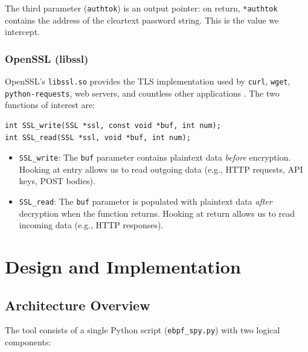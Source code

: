 \documentclass[11pt,a4paper]{article}
\begin{document}
The third parameter (\texttt{authtok}) is an output pointer: on return,
\texttt{*authtok} contains the address of the cleartext password string. This
is the value we intercept.

\subsubsection{OpenSSL (libssl)}

OpenSSL's \texttt{libssl.so} provides the TLS implementation used by
\texttt{curl}, \texttt{wget}, \texttt{python-requests}, web servers, and
countless other applications \cite{openssl_docs}. The two functions of
interest are:

\begin{lstlisting}[style=cstyle, caption={SSL\_write and SSL\_read signatures}, label={lst:ssl_sig}]
int SSL_write(SSL *ssl, const void *buf, int num);
int SSL_read(SSL *ssl, void *buf, int num);
\end{lstlisting}

\begin{itemize}
    \item \texttt{SSL\_write}: The \texttt{buf} parameter contains plaintext
          data \textit{before} encryption. Hooking at entry allows us to read
          outgoing data (e.g., HTTP requests, API keys, POST bodies).
    \item \texttt{SSL\_read}: The \texttt{buf} parameter is populated with
          plaintext data \textit{after} decryption when the function returns.
          Hooking at return allows us to read incoming data (e.g., HTTP
          responses).
\end{itemize}


\section{Design and Implementation}
\label{sec:design}

\subsection{Architecture Overview}
\label{subsec:architecture}

The tool consists of a single Python script (\texttt{ebpf\_spy.py}) with two
logical components:
\end{document}
